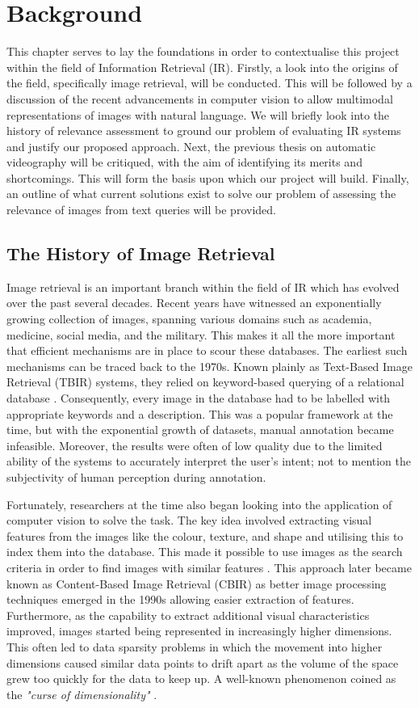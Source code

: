 \documentclass{l4proj}
\begin{document}
\chapter{Background}
This chapter serves to lay the foundations in order to contextualise this project within the field of Information Retrieval (IR). Firstly, a look into the origins of the field, specifically image retrieval, will be conducted. This will be followed by a discussion of the recent advancements in computer vision to allow multimodal representations of images with natural language. We will briefly look into the history of relevance assessment to ground our problem of evaluating IR systems and justify our proposed approach. Next, the previous thesis on automatic videography will be critiqued, with the aim of identifying its merits and shortcomings. This will form the basis upon which our project will build. Finally, an outline of what current solutions exist to solve our problem of assessing the relevance of images from text queries will be provided.

\section{The History of Image Retrieval}
Image retrieval is an important branch within the field of IR which has evolved over the past several decades. Recent years have witnessed an exponentially growing collection of images, spanning various domains such as academia, medicine, social media, and the military. This makes it all the more important that efficient mechanisms are in place to scour these databases. The earliest such mechanisms can be traced back to the 1970s. Known plainly as Text-Based Image Retrieval (TBIR) systems, they relied on keyword-based querying of a relational database \citep{chang1979tbir}. Consequently, every image in the database had to be labelled with appropriate keywords and a description. This was a popular framework at the time, but with the exponential growth of datasets, manual annotation became infeasible. Moreover, the results were often of low quality due to the limited ability of the systems to accurately interpret the user's intent; not to mention the subjectivity of human perception during annotation.

Fortunately, researchers at the time also began looking into the application of computer vision to solve the task. The key idea involved extracting visual features from the images like the colour, texture, and shape and utilising this to index them into the database. This made it possible to use images as the search criteria in order to find images with similar features \citep{chang1981pictorial}. This approach later became known as Content-Based Image Retrieval (CBIR) as better image processing techniques emerged in the 1990s allowing easier extraction of features. Furthermore, as the capability to extract additional visual characteristics improved, images started being represented in increasingly higher dimensions. This often led to data sparsity problems in which the movement into higher dimensions caused similar data points to drift apart as the volume of the space grew too quickly for the data to keep up. A well-known phenomenon coined as the \emph{"curse of dimensionality"} \citep{bellman1957dp}.
\end{document}
